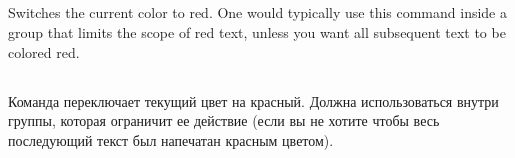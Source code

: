 \begin{EN}

\subsection{}
Switches the current color to red. One would typically use this command
inside a group that limits the scope of red text, unless
you want all subsequent text to be colored red.
\end{EN}

\begin{RU}

\subsection{}
Команда переключает текущий цвет на красный. Должна использоваться
внутри группы, которая ограничит ее действие (если вы не хотите
чтобы весь последующий текст был напечатан красным цветом).
\end{RU}

